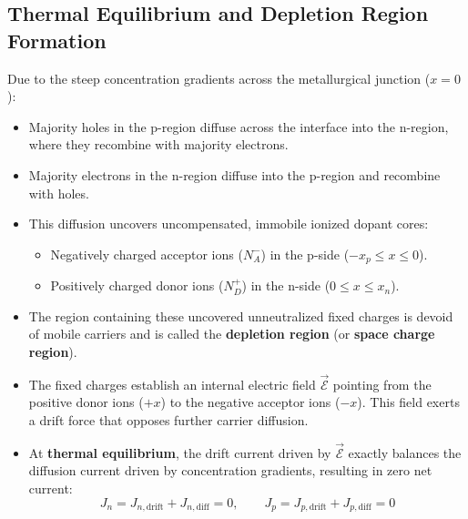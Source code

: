 \documentclass[12pt,a4paper]{article}
\begin{document}
\subsection{Thermal Equilibrium and Depletion Region Formation}
Due to the steep concentration gradients across the metallurgical junction ($x = 0$):
\begin{itemize}[leftmargin=*, itemsep=3pt]
  \item Majority holes in the p-region diffuse across the interface into the n-region, where they recombine with majority electrons.
  \item Majority electrons in the n-region diffuse into the p-region and recombine with holes.
  \item This diffusion uncovers uncompensated, immobile ionized dopant cores:
    \begin{itemize}
      \item Negatively charged acceptor ions ($N_A^-$) in the p-side ($ -x_p \le x \le 0 $).
      \item Positively charged donor ions ($N_D^+$) in the n-side ($ 0 \le x \le x_n $).
    \end{itemize}
  \item The region containing these uncovered unneutralized fixed charges is devoid of mobile carriers and is called the \textbf{depletion region} (or \textbf{space charge region}).
  \item The fixed charges establish an internal electric field $\vec{\mathcal{E}}$ pointing from the positive donor ions ($+x$) to the negative acceptor ions ($-x$). This field exerts a drift force that opposes further carrier diffusion.
  \item At \textbf{thermal equilibrium}, the drift current driven by $\vec{\mathcal{E}}$ exactly balances the diffusion current driven by concentration gradients, resulting in zero net current:
  \begin{equation}
    J_n = J_{n,\text{drift}} + J_{n,\text{diff}} = 0, \qquad J_p = J_{p,\text{drift}} + J_{p,\text{diff}} = 0
  \end{equation}
\end{itemize}
\end{document}
